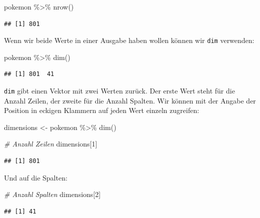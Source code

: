 \documentclass[
]{book}
\newenvironment{Shaded}{\begin{snugshade}}{\end{snugshade}}
\newcommand{\CommentTok}[1]{\textcolor[rgb]{0.56,0.35,0.01}{\textit{#1}}}
\newcommand{\DecValTok}[1]{\textcolor[rgb]{0.00,0.00,0.81}{#1}}
\newcommand{\FunctionTok}[1]{\textcolor[rgb]{0.00,0.00,0.00}{#1}}
\newcommand{\NormalTok}[1]{#1}
\newcommand{\OtherTok}[1]{\textcolor[rgb]{0.56,0.35,0.01}{#1}}
\newcommand{\SpecialCharTok}[1]{\textcolor[rgb]{0.00,0.00,0.00}{#1}}
\begin{document}
\begin{Shaded}
\begin{Highlighting}[]
\NormalTok{pokemon }\SpecialCharTok{\%\textgreater{}\%}
  \FunctionTok{nrow}\NormalTok{()}
\end{Highlighting}
\end{Shaded}

\begin{verbatim}
## [1] 801
\end{verbatim}

Wenn wir beide Werte in einer Ausgabe haben wollen können wir \texttt{dim} verwenden:

\begin{Shaded}
\begin{Highlighting}[]
\NormalTok{pokemon }\SpecialCharTok{\%\textgreater{}\%}
  \FunctionTok{dim}\NormalTok{()}
\end{Highlighting}
\end{Shaded}

\begin{verbatim}
## [1] 801  41
\end{verbatim}

\texttt{dim} gibt einen Vektor mit zwei Werten zurück. Der erste Wert steht für die Anzahl Zeilen, der zweite für die Anzahl Spalten. Wir können mit der Angabe der Position in eckigen Klammern auf jeden Wert einzeln zugreifen:

\begin{Shaded}
\begin{Highlighting}[]
\NormalTok{dimensions }\OtherTok{\textless{}{-}}\NormalTok{ pokemon }\SpecialCharTok{\%\textgreater{}\%} \FunctionTok{dim}\NormalTok{()}

\CommentTok{\# Anzahl Zeilen}
\NormalTok{dimensions[}\DecValTok{1}\NormalTok{]}
\end{Highlighting}
\end{Shaded}

\begin{verbatim}
## [1] 801
\end{verbatim}

Und auf die Spalten:

\begin{Shaded}
\begin{Highlighting}[]
\CommentTok{\# Anzahl Spalten}
\NormalTok{dimensions[}\DecValTok{2}\NormalTok{]}
\end{Highlighting}
\end{Shaded}

\begin{verbatim}
## [1] 41
\end{verbatim}
\end{document}
